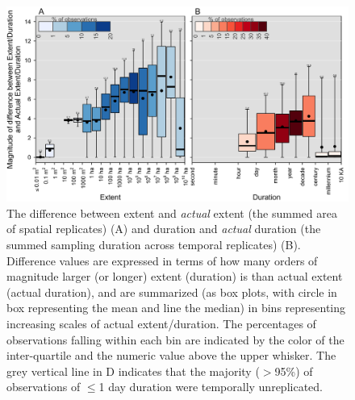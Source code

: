 \documentclass[12pt]{article}
\begin{document}
\begin{figure}[ht]
\includegraphics[width=1\textwidth]{../vignettes/figures/fig3.png}
\vspace{-0.2 cm}
\caption{The difference between extent and \emph{actual} extent (the summed area of spatial replicates) (A) and duration and \emph{actual} duration (the summed sampling duration across temporal replicates) (B). Difference values are expressed in terms of how many orders of magnitude larger (or longer) extent (duration) is than actual extent (actual duration), and are summarized (as box plots, with circle in box representing the mean and line the median) in bins representing increasing scales of actual extent/duration.  The percentages of observations falling within each bin are indicated by the color of the inter-quartile and the numeric value above the upper whisker. The grey vertical line in D indicates that the majority ($>$95\%) of observations of $\leq$1 day duration were temporally unreplicated.}
\label{afoto1}
\end{figure}
\end{document}
